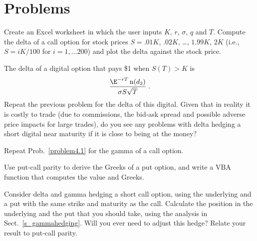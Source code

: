 \section*{Problems}
\begin{prob} \label{problem4.1} Create an Excel worksheet in which the user inputs $K$, $r$, $\sigma$, $q$ and $T$.  Compute the delta of a call option 
for stock prices $S = .01K$, $.02K$, \ldots, $1.99K$, $2K$ (i.e., $S = iK/100$ for $i=1, \ldots 200$) and plot the delta against the stock price.  
\end{prob}
\begin{prob} The delta of a digital option that pays \$1 when $S(T)>K$ is 
$$\frac{\E^{-rT}\nd(d_2)}{\sigma S\sqrt{T}}\; .$$
Repeat  the previous problem for the delta of this digital.  Given that in reality it is costly to trade (due to commissions, the bid-ask spread and possible adverse price impacts for large trades), do you see any problems with delta hedging a short digital near maturity if it is close to being at the money?
\end{prob}
\begin{prob} Repeat Prob.~\ref{problem4.1} for the gamma of a call option.
\end{prob}\begin{prob} Use put-call parity to derive the Greeks of a put option, and write a VBA function that computes the value and Greeks.
\end{prob}\begin{prob} Consider delta and gamma hedging a short call option, using the underlying and a put with the same strike and maturity as the call.  Calculate the position in the underlying and the put that you should take, using the analysis in Sect.~\ref{s_gammahedging}.  Will you ever need to adjust this hedge?  Relate your result to put-call parity.
\end{prob}
